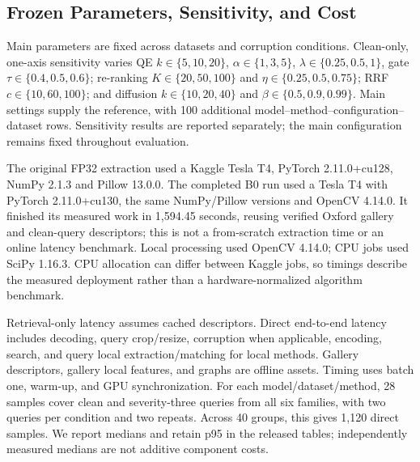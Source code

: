 \subsection{Frozen Parameters, Sensitivity, and Cost}
Main parameters are fixed across datasets and corruption conditions. Clean-only, one-axis sensitivity varies QE $k\in\{5,10,20\}$, $\alpha\in\{1,3,5\}$, $\lambda\in\{0.25,0.5,1\}$, gate $\tau\in\{0.4,0.5,0.6\}$; re-ranking $K\in\{20,50,100\}$ and $\eta\in\{0.25,0.5,0.75\}$; RRF $c\in\{10,60,100\}$; and diffusion $k\in\{10,20,40\}$ and $\beta\in\{0.5,0.9,0.99\}$. Main settings supply the reference, with 100 additional model--method--configuration--dataset rows. Sensitivity results are reported separately; the main configuration remains fixed throughout evaluation.

The original FP32 extraction used a Kaggle Tesla T4, PyTorch 2.11.0+cu128, NumPy 2.1.3 and Pillow 13.0.0. The completed B0 run used a Tesla T4 with PyTorch 2.11.0+cu130, the same NumPy/Pillow versions and OpenCV 4.14.0. It finished its measured work in 1,594.45 seconds, reusing verified Oxford gallery and clean-query descriptors; this is not a from-scratch extraction time or an online latency benchmark. Local processing used OpenCV 4.14.0; CPU jobs used SciPy 1.16.3. CPU allocation can differ between Kaggle jobs, so timings describe the measured deployment rather than a hardware-normalized algorithm benchmark.

Retrieval-only latency assumes cached descriptors. Direct end-to-end latency includes decoding, query crop/resize, corruption when applicable, encoding, search, and query local extraction/matching for local methods. Gallery descriptors, gallery local features, and graphs are offline assets. Timing uses batch one, warm-up, and GPU synchronization. For each model/dataset/method, 28 samples cover clean and severity-three queries from all six families, with two queries per condition and two repeats. Across 40 groups, this gives 1,120 direct samples. We report medians and retain p95 in the released tables; independently measured medians are not additive component costs.
